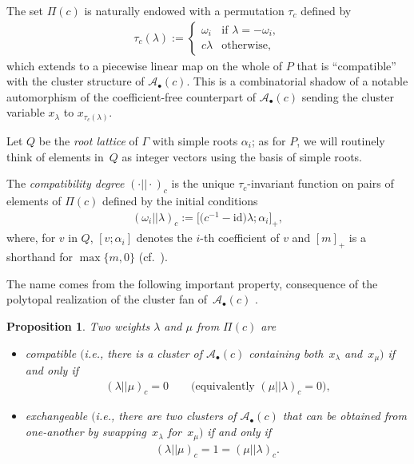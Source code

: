 \documentclass[pdftex]{sigma}
\numberwithin{equation}{section}
\newtheorem{Proposition}[Theorem]{Proposition}
{
  \theoremstyle{Definition}
  \newtheorem{Definition}[Theorem]{Definition}
  \newtheorem{Remark}[Theorem]{Remark}
}
\newcommand{\cA}{\mathcal{A}}
\newcommand{\id}{\mathrm{id}}
\begin{document}
  The set $\Pi(c)$ is naturally endowed with a permutation $\tau_c$ def\/ined by
  \begin{gather*}
    \tau_c (\lambda) :=
    \begin{cases}
      \omega_i & \text{if $\lambda = -\omega_i$}, \\
      c\lambda & \text{otherwise},
    \end{cases}
  \end{gather*}
  which extends to a piecewise linear map on the whole of $P$ that is ``compatible'' with the cluster structure of $\cA_\bullet(c)$.
  This is a combinatorial shadow of a notable automorphism of the coef\/f\/icient-free counterpart of $\cA_\bullet(c)$ sending the cluster variable $x_\lambda$ to $x_{\tau_c(\lambda)}$.

  Let $Q$ be the \emph{root lattice} of $\Gamma$ with simple roots $\alpha_i$; as for $P$, we will routinely think of elements in~$Q$ as integer vectors using the basis of simple roots.
  \begin{Definition}
    The \emph{compatibility degree} $(\cdot||\cdot)_c$ is the unique $\tau_c$-invariant function on pairs of elements of $\Pi(c)$ def\/ined by the initial conditions
    \begin{gather*}
      (\omega_i||\lambda)_c := \big[ \big(c^{-1}-\id\big)\lambda ; \alpha_i\big]_+,
    \end{gather*}
    where, for $v$ in $Q$, $[v;\alpha_i]$ denotes the $i$-th coef\/f\/icient of $v$ and $[m]_+$ is a shorthand for $\max\{m, 0\}$ (cf.~\cite[Proposition~5.1]{YZ08}).
  \end{Definition}

  The name comes from the following important property, consequence of the polytopal reali\-za\-tion of the cluster fan of~$\cA_\bullet(c)$ \cite{CFZ02,Ste13}.
  \begin{Proposition}
    Two weights $\lambda$ and $\mu$ from $\Pi(c)$ are
    \begin{itemize}\itemsep=0pt
      \item
        compatible $($i.e., there is a cluster of $\cA_\bullet(c)$ containing both~$x_\lambda$ and~$x_\mu)$ if and only if
        \begin{gather*}
          (\lambda||\mu)_c = 0 \qquad
          \text{$($equivalently $(\mu||\lambda)_c=0)$,}
        \end{gather*}

      \item
        exchangeable $($i.e., there are two clusters of $\cA_\bullet(c)$ that can be obtained from one-another by swapping~$x_\lambda$ for~$x_\mu)$ if and only if
        \begin{gather*}
          (\lambda||\mu)_c = 1 = (\mu||\lambda)_c.
        \end{gather*}
    \end{itemize}
  \end{Proposition}
\end{document}
